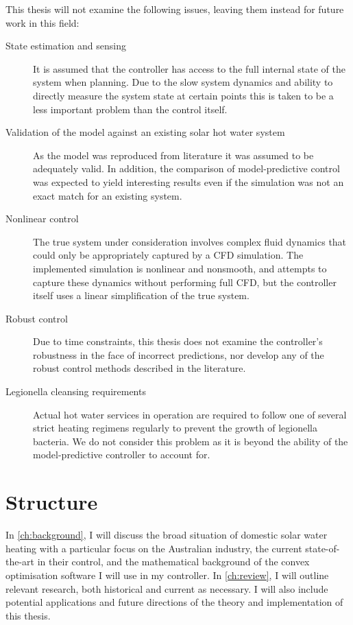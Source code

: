 This thesis will not examine the following issues, leaving them instead for future work in this field:

\begin{description}
	\item[State estimation and sensing]
         It is assumed that the controller has access to the full internal state of the system when planning.
         Due to the slow system dynamics and ability to directly measure the system state at certain points this is taken to be a less important problem than the control itself.
	\item[Validation of the model against an existing solar hot water system]
         As the model was reproduced from literature it was assumed to be adequately valid.
         In addition, the comparison of model-predictive control was expected to yield interesting results even if the simulation was not an exact match for an existing system.
	\item[Nonlinear control]
         The true system under consideration involves complex fluid dynamics that could only be appropriately captured by a CFD simulation.
         The implemented simulation is nonlinear and nonsmooth, and attempts to capture these dynamics without performing full CFD, but the controller itself uses a linear simplification of the true system.
	\item[Robust control]
         Due to time constraints, this thesis does not examine the controller's robustness in the face of incorrect predictions, nor develop any of the robust control methods described in the literature.
	\item[Legionella cleansing requirements]
			Actual hot water services in operation are required to follow one of several strict heating regimens regularly to prevent the growth of legionella bacteria.
			We do not consider this problem as it is beyond the ability of the model-predictive controller to account for.
\end{description}

\section{Structure}

In \autoref{ch:background}, I will discuss the broad situation of domestic solar water heating with a particular focus on the Australian industry, the current state-of-the-art in their control, and the mathematical background of the convex optimisation software I will use in my controller.
In \autoref{ch:review}, I will outline relevant research, both historical and current as necessary.
I will also include potential applications and future directions of the theory and implementation of this thesis.

